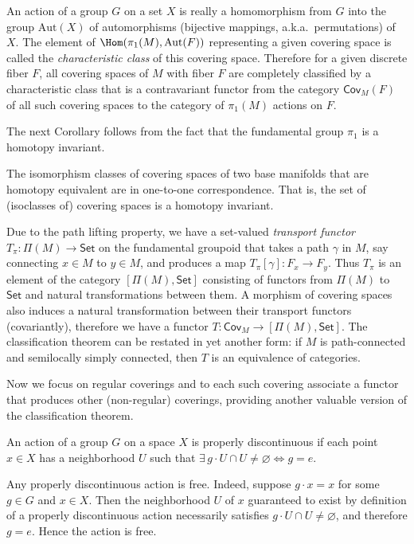 \begin{rem}
    An action of a group $G$ on a set $X$ is really a homomorphism from $G$ into the group $\mathrm{Aut}(X)$ of automorphisms (bijective mappings, a.k.a.~permutations) of $X$. The element of $\Hom(\pi_1(M),\mathrm{Aut}(F))$ representing a given covering space is called the \emph{characteristic class} of this covering space. Therefore for a given discrete fiber $F$, all covering spaces of $M$ with fiber $F$ are completely classified by a characteristic class that is a contravariant functor from the category $\mathsf{Cov}_M(F)$ of all such covering spaces to the category of $\pi_1(M)$ actions on $F$.
\end{rem}

The next Corollary follows from the fact that the fundamental group $\pi_1$ is a homotopy invariant.
\begin{cor}
    The isomorphism classes of covering spaces of two base manifolds that are homotopy equivalent are in one-to-one correspondence. That is, the set of (isoclasses of) covering spaces is a homotopy invariant. 
\end{cor}


\begin{rem}
    Due to the path lifting property, we have a set-valued \emph{transport functor} $T_\pi:\Pi(M)\to \mathsf{Set}$ on the fundamental groupoid that takes a path $\gamma$ in $M$, say connecting $x\in M$ to $y\in M$, and produces a map $T_\pi[\gamma]:F_x\to F_y$. Thus $T_\pi$ is an element of the category $[\Pi(M),\mathsf{Set}]$ consisting of functors from $\Pi(M)$ to $\mathsf{Set}$ and natural transformations between them. A morphism of covering spaces also induces a natural transformation between their transport functors (covariantly), therefore we have a functor $T:\mathsf{Cov}_M\to [\Pi(M),\mathsf{Set}]$. The classification theorem can be restated in yet another form: if $M$ is path-connected and semilocally simply connected, then $T$ is an equivalence of categories.
\end{rem}


Now we focus on regular coverings and to each such covering associate a functor that produces other (non-regular) coverings, providing another valuable version of the classification theorem. 

\begin{defn}
    An action of a group $G$ on a space $X$ is properly discontinuous if each point $x\in X$ has a neighborhood $U$ such that $\exists\, g\cdot U\cap U\neq \varnothing \Leftrightarrow g=e$.
\end{defn}
\begin{rem}
    Any properly discontinuous action is free. Indeed, suppose $g\cdot x=x$ for some $g\in G$ and $x\in X$. Then the neighborhood $U$ of $x$ guaranteed to exist by definition of a properly discontinuous action necessarily satisfies $g\cdot U\cap U\neq\varnothing$, and therefore $g=e$. Hence the action is free.
\end{rem}

